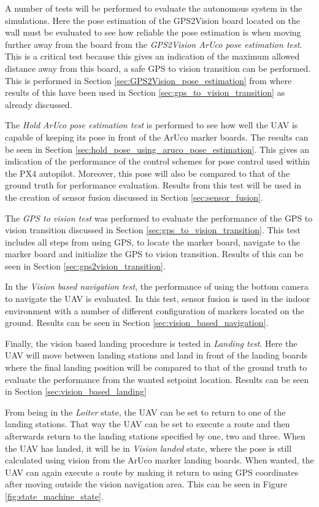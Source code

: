 \documentclass[../Head/report.tex]{subfiles}
\begin{document}
A number of tests will be performed to evaluate the autonomous system in the simulations. Here the pose estimation of the GPS2Vision board located on the wall must be evaluated to see how reliable the pose estimation is when moving further away from the board from the \textit{GPS2Vision ArUco pose estimation test}. This is a critical test because this gives an indication of the maximum allowed distance away from this board, a safe GPS to vision transition can be performed. This is performed in Section \ref{sec:GPS2Vision_pose_estimation} from where results of this have been used in Section \ref{sec:gps_to_vision_transition} as already discussed. 

The \textit{Hold ArUco pose estimation test} is performed to see how well the UAV is capable of keeping its pose in front of the ArUco marker boards. The results can be seen in Section \ref{sec:hold_pose_using_aruco_pose_estimation}. This gives an indication of the performance of the control schemes for pose control used within the PX4 autopilot. Moreover, this pose will also be compared to that of the ground truth for performance evaluation. Results from this test will be used in the creation of sensor fusion discussed in Section \ref{sec:sensor_fusion}.

The \textit{GPS to vision test} was performed to evaluate the performance of the GPS to vision transition discussed in Section \ref{sec:gps_to_vision_transition}. This test includes all steps from using GPS, to locate the marker board, navigate to the marker board and initialize the GPS to vision transition. Results of this can be seen in Section \ref{sec:gps2vision_transition}.

In the \textit{Vision based navigation test}, the performance of using the bottom camera to navigate the UAV is evaluated. In this test, sensor fusion is used in the indoor environment with a number of different configuration of markers located on the ground. Results can be seen in Section \ref{sec:vision_based_navigation}. 

Finally, the vision based landing procedure is tested in \textit{Landing test}. Here the UAV will move between landing stations and land in front of the landing boards where the final landing position will be compared to that of the ground truth to evaluate the performance from the wanted setpoint location. Results can be seen in Section \ref{sec:vision_based_landing}

From being in the \textit{Loiter} state, the UAV can be set to return to one of the landing stations. That way the UAV can be set to execute a route and then afterwards return to the landing stations specified by one, two and three. When the UAV has landed, it will be in \textit{Vision landed} state, where the pose is still calculated using vision from the ArUco marker landing boards. When wanted, the UAV can again execute a route by making it return to using GPS coordinates after moving outside the vision navigation area. This can be seen in Figure \ref{fig:state_machine_state}. 
\end{document}
